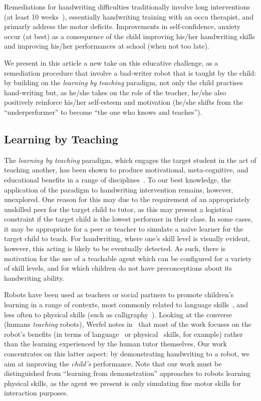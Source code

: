 \documentclass{article}
\begin{document}
Remediations for handwriting difficulties traditionally involve
long interventions (at least 10 weeks~\cite{Hoy2011}), essentially handwriting
training with an occu therapist, and primarly address the motor deficits.
Improvements in self-confidence, anxiety occur (at best) as a consequence of the
child improving his/her handwriting skills and improving his/her performances at
school (when not too late).

We present in this article a new take on this educative challenge, as a
remediation procedure that involve a bad-writer robot that is taught by the
child: by building on the \emph{learning by teaching} paradigm, not only the
child practises hand-writing but, as he/she takes on the role of the teacher,
he/she also positively reinforce his/her self-esteem and motivation (he/she
shifts from the ``underperformer'' to become ``the one who knows and teaches'').

\subsection{Learning by Teaching}

The \emph{learning by teaching} paradigm, which engages the target student in
the act of teaching another, has been shown to produce motivational,
meta-cognitive, and educational benefits in a range of disciplines~\cite{Rohrbeck2003}. 
To our best knowledge, the application of the paradigm to
handwriting intervention remains, however, unexplored. One reason for this may
due to the requirement of an appropriately unskilled peer for the target child
to tutor, as this may present a logistical constraint if the target child is the
lowest performer in their class.  In some cases, it may be appropriate for a
peer or teacher to simulate a na\"ive learner for the target child to teach.
For handwriting, where one's skill level is visually evident, however, this
acting is likely to be eventually detected. As such, there is motivation for the
use of a teachable agent which can be configured for a variety of skill levels,
and for which children do not have preconceptions about its handwriting ability.

Robots have been used as teachers or social partners to promote children's
learning in a range of contexts, most commonly related to language
skills~\cite{han2010robot}, and less often to physical skills (such as
calligraphy~\cite{Matsui2013}).  Looking at the converse (humans \emph{teaching}
robots), Werfel notes in~\cite{Werfel2014} that most of the work focuses on the
robot's benefits (in terms of language~\cite{Saunders2010} or
physical~\cite{Mulling2013} skills, for example) rather than the learning
experienced by the human tutor themselves.  Our work concentrates on this latter
aspect: by demonstrating handwriting to a robot, we aim at improving the
\emph{child's} performance. Note that our work must be distinguished from
``learning from demonstration'' approaches to robots learning physical skills,
as the agent we present is only simulating fine motor skills for interaction
purposes.
\end{document}
